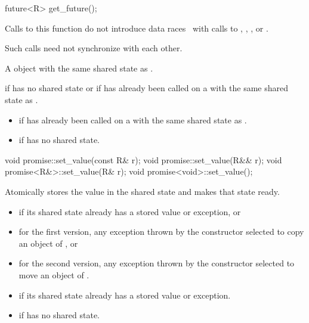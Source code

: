 %
\begin{itemdecl}
future<R> get_future();
\end{itemdecl}

\begin{itemdescr}
\pnum
\sync
Calls to this function do not introduce
data races~ with calls to
,
,
, or
.
\begin{note}
Such calls need not synchronize with each other.
\end{note}

\pnum
\returns
A  object with the same shared state as
.

\pnum
\throws
{} if  has no shared state or if
 has already been called on a  with the same
shared state as .

\pnum
\errors

\begin{itemize}
\item {} if  has already been called on
a  with the same shared state as .

\item {} if  has no shared state.
\end{itemize}
\end{itemdescr}

%
\begin{itemdecl}
void promise::set_value(const R& r);
void promise::set_value(R&& r);
void promise<R&>::set_value(R& r);
void promise<void>::set_value();
\end{itemdecl}

\begin{itemdescr}
\pnum
\effects
Atomically stores the value  in the shared state and
makes that state ready.

\pnum
\throws
\begin{itemize}
\item {} if its shared state
already has a stored value or exception, or
\item for the first version, any exception thrown by the constructor selected to copy an object of , or
\item for the second version, any exception thrown by the constructor selected to move an object of .
\end{itemize}

\pnum
\errors
\begin{itemize}
\item {} if its shared state
already has a stored value or exception.
\item {} if  has no shared state.
\end{itemize}
\end{itemdescr}

